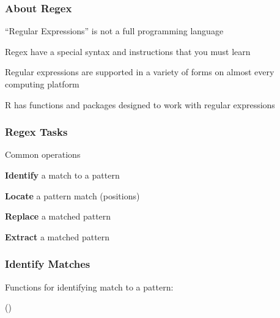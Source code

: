 \documentclass[12pt]{beamer}\usepackage[]{graphicx}\usepackage[]{color}
\begin{document}

\begin{frame}
\frametitle{About Regex}

\bi
  \item ``Regular Expressions'' is not a full programming language
  \item Regex have a special syntax and instructions that you must learn
  \item Regular expressions are supported in a variety of forms on almost every computing platform
  \item R has functions and packages designed to work with regular expressions
\ei

\end{frame}


\begin{frame}
\frametitle{Regex Tasks}

Common operations
\bi
  \item \textbf{Identify} a match to a pattern
  \item \textbf{Locate} a pattern match (positions)
  \item \textbf{Replace} a matched pattern
  \item \textbf{Extract} a matched pattern
\ei

\end{frame}


\begin{frame}
\begin{center}
\Huge{}
\end{center}
\end{frame}


\begin{frame}
\frametitle{Identify Matches}

Functions for identifying match to a pattern: 
\bbi
  \item {}
  \item {}
  \item {} ()
\ei

\end{frame}

\end{document}
